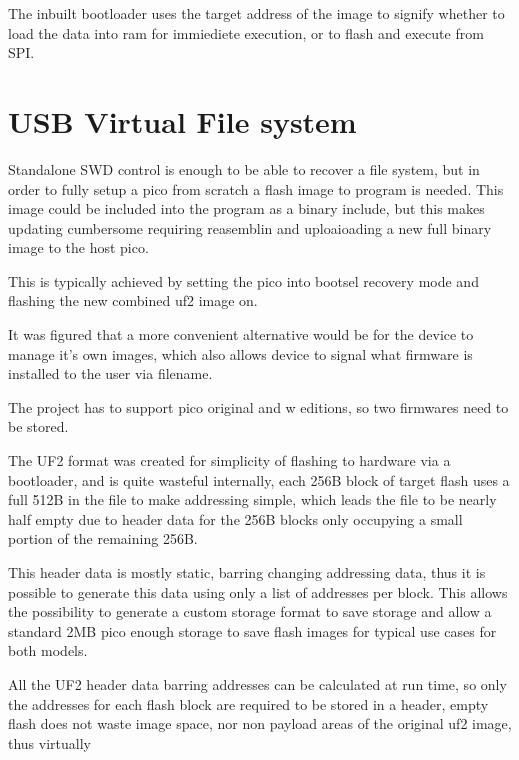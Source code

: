 The inbuilt bootloader uses the target address of the image to signify whether to load the data into ram for immiediete execution, or to flash and execute from SPI.

\pagebreak
\section{USB Virtual File system}
Standalone SWD control is enough to be able to recover a file system, but in order to fully setup a pico from scratch a flash image to program is needed. This image could be included into the program as a binary include, but this makes updating cumbersome requiring reasemblin and uploaioading a new full binary image to the host pico.

This is typically achieved by setting the pico into bootsel recovery mode and flashing the new combined uf2 image on.

It was figured that a more convenient alternative would be for the device to manage it's own images, which also allows device to signal what firmware is installed to the user via filename.

The project has to support pico original and w editions, so two firmwares need to be stored.

The UF2 format was created for simplicity of flashing to hardware via a bootloader, and is quite wasteful internally, each 256B block of target flash uses a full 512B in the file to make addressing simple, which leads the file to be nearly half empty due to header data for the 256B blocks only occupying a small portion of the remaining 256B.

This header data is mostly static, barring changing addressing data, thus it is possible to generate this data using only a list of addresses per block. This allows the possibility to generate a custom storage format to save storage and allow a standard 2MB pico enough storage to save flash images for typical use cases for both models.

All the UF2 header data barring addresses can be calculated at run time, so only the addresses for each flash block are required to be stored in a header, empty flash does not waste image space, nor non payload areas of the original uf2 image, thus virtually

\pagebreak





